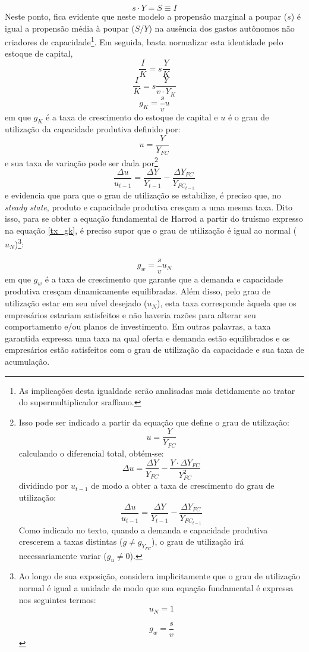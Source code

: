 $$
s\cdot Y = S \equiv I
$$
Neste ponto, fica evidente que neste modelo a propensão marginal a poupar ($s$) é igual a propensão média à poupar ($S/Y$) na ausência dos gastos autônomos não criadores de capacidade\footnote{As implicações desta igualdade serão analisadas mais detidamente ao tratar do supermultiplicador sraffiano.}. Em seguida, basta normalizar esta identidade pelo estoque de capital,
$$
\frac{I}{K} = s\frac{Y}{K}
$$
$$
\frac{I}{K} = s\frac{Y}{v\cdot Y_K}
$$
\begin{equation}
\label{tx_gk}
    g_K = \frac{s}{v}u
\end{equation}
em que $g_K$ é a taxa de crescimento do estoque de capital e $u$ é o grau de utilização da capacidade produtiva definido por:
$$
u = \frac{Y}{Y_{FC}}
$$
e sua taxa de variação pode ser dada por\footnote{Isso pode ser indicado a partir da equação que define o grau de utilização:
	$$
	u = \frac{Y}{Y_{FC}}
	$$
	calculando o diferencial total, obtém-se:
	$$
	\Delta u = \frac{\Delta Y}{ Y_{FC}} - \frac{Y\cdot \Delta Y_{FC}}{Y_{FC}^2}
	$$
	dividindo por $u_{t-1}$ de modo a obter a taxa de crescimento do grau de utilização:
	$$
	\frac{\Delta u}{u_{t-1}} = \frac{\Delta Y}{Y_{t-1}} - \frac{\Delta Y_{FC}}{Y_{FC_{t-1}}}
	$$
	Como indicado no texto, quando a demanda e capacidade produtiva crescerem a taxas distintas ($g \neq g_{Y_{FC}}$), o grau de utilização irá necessariamente variar ($g_u \neq 0$).
}
$$
\frac{\Delta u}{u_{t-1}} = \frac{\Delta Y}{Y_{t-1}} - \frac{\Delta Y_{FC}}{Y_{FC_{t-1}}}
$$
e evidencia que para que o grau de utilização se estabilize, é preciso que, no \textit{steady state}, produto e capacidade produtiva cresçam a uma mesma taxa. 
Dito isso, para se obter a equação fundamental de Harrod a partir do truísmo expresso na equação \ref{tx_gk}, é preciso supor que o grau de utilização é igual ao normal ($u_N$)\footnote{
	Ao longo de sua exposição, \textcite{harrod_essay_1939} considera implicitamente que o grau de utilização normal é igual a unidade de modo que sua equação fundamental é expressa nos seguintes termos:
	$$
	u_N = 1
	$$
	
	$$
	g_w = \frac{s}{v}
	$$
}:

\begin{equation}
    \label{Fundamental}
    g_w = \frac{s}{v}u_N
\end{equation}
em que $g_w$ é a taxa de crescimento que garante que a demanda e capacidade produtiva cresçam dinamicamente equilibradas. Além disso, pelo grau de utilização estar em seu nível desejado ($u_N$), esta taxa corresponde àquela que os empresários estariam satisfeitos e não haveria razões para alterar seu comportamento e/ou planos de investimento. Em outras palavras, a taxa garantida expressa uma taxa na qual oferta e demanda estão equilibrados e os empresários estão satisfeitos com o grau de utilização da capacidade e sua taxa de acumulação. 

